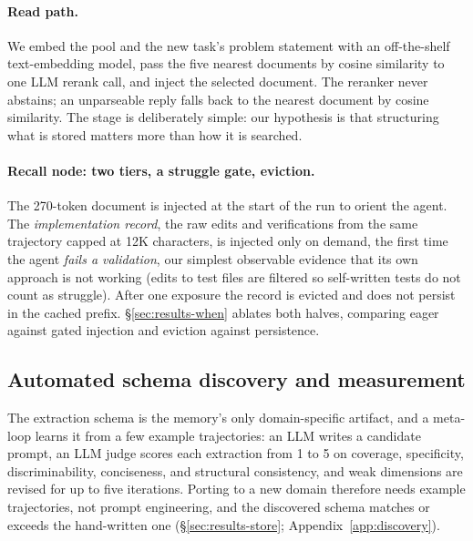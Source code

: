 \documentclass{article}
\begin{document}
\paragraph{Read path.} We embed the pool and the new task's problem statement with an off-the-shelf text-embedding model, pass the five nearest documents by cosine similarity to one LLM rerank call, and inject the selected document. The reranker never abstains; an unparseable reply falls back to the nearest document by cosine similarity. The stage is deliberately simple: our hypothesis is that structuring what is stored matters more than how it is searched.
\label{sec:method-read}

\paragraph{Recall node: two tiers, a struggle gate, eviction.} The 270-token document is injected at the start of the run to orient the agent. The \emph{implementation record}, the raw edits and verifications from the same trajectory capped at 12K characters, is injected only on demand, the first time the agent \emph{fails a validation}, our simplest observable evidence that its own approach is not working (edits to test files are filtered so self-written tests do not count as struggle). After one exposure the record is evicted and does not persist in the cached prefix. \S\ref{sec:results-when} ablates both halves, comparing eager against gated injection and eviction against persistence.
\label{sec:method-recall}

\subsection{Automated schema discovery and measurement}
\label{sec:method-discovery}

The extraction schema is the memory's only domain-specific artifact, and a meta-loop learns it from a few example trajectories: an LLM writes a candidate prompt, an LLM judge scores each extraction from 1 to 5 on coverage, specificity, discriminability, conciseness, and structural consistency, and weak dimensions are revised for up to five iterations. Porting to a new domain therefore needs example trajectories, not prompt engineering, and the discovered schema matches or exceeds the hand-written one (\S\ref{sec:results-store}; Appendix~\ref{app:discovery}).
\end{document}
